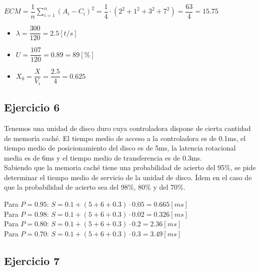 \begin{enumerate}
    \begin{tcolorbox}[colback=white,colframe=cyan!50!black,fonttitle=\bfseries]
    $ECM = \dfrac{1}{n}\sum_{i=1}^{n}(A_i - C_i)^2 = \dfrac{1}{4}\cdot(2^2 + 1^2 + 3^2 + 7^2) = \dfrac{63}{4}=15.75$
    \begin{itemize}
        \item $\lambda = \dfrac{300}{120} = 2.5[t/s]$
        \item $U = \dfrac{107}{120} = 0.89=89[\%]$
        \item $X_0 = \dfrac{X}{V_i} = \dfrac{2.5}{4} = 0.625$
    \end{itemize}
    \end{tcolorbox}
\end{enumerate}


\subsection{Ejercicio 6}

Tenemos una unidad de disco duro cuya controladora dispone de cierta cantidad de memoria caché. El tiempo medio de acceso a la controladora es de 0.1ms, el tiempo medio de posicionamiento del disco es de 5ms, la latencia rotacional media es de 6ms y el tiempo medio de transferencia es de 0.3ms.\\

Sabiendo que la memoria caché tiene una probabilidad de acierto del 95\%, se pide determinar el tiempo medio de servicio de la unidad de disco. Ídem en el caso de que la probabilidad de acierto sea del 98\%, 80\% y del 70\%.\\
\begin{tcolorbox}[colback=white,colframe=cyan!50!black,fonttitle=\bfseries]
Para $P=0.95$: $S = 0.1+(5+6+0.3)\cdot0.05=0.665[ms]$\\
Para $P=0.98$: $S = 0.1+(5+6+0.3)\cdot0.02=0.326[ms]$\\
Para $P=0.80$: $S = 0.1+(5+6+0.3)\cdot0.2=2.36[ms]$\\
Para $P=0.70$: $S = 0.1+(5+6+0.3)\cdot0.3=3.49[ms]$
\end{tcolorbox}
\subsection{Ejercicio 7}

